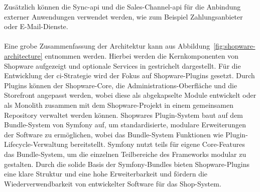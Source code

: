 Zusätzlich können die Sync-\acrshort{api} und die Sales-Channel-\acrshort{api} für die Anbindung externer Anwendungen
verwendet werden, wie zum Beispiel Zahlungsanbieter oder E-Mail-Dienste.
\\\\
Eine grobe Zusammenfassung der Architektur kann aus Abbildung\ \ref{fig:shopware-architecture} entnommen werden.
Hierbei werden die Kernkomponenten von Shopware aufgezeigt und optionale Services in gestrichelt dargestellt.
Für die Entwicklung der \acrshort{ci}-Strategie wird der Fokus auf Shopware-Plugins gesetzt.
Durch Plugins können der Shopware-Core, die Administrations-Oberfläche und die Storefront angepasst werden, wobei diese
als abgekapselte Module entwickelt oder als Monolith zusammen mit dem Shopware-Projekt in einem gemeinsamen Repository
verwaltet werden können.
Shopwares Plugin-System baut auf dem Bundle-System von Symfony auf, um standardisierte, modulare Erweiterungen der
Software zu ermöglichen, wobei das Bundle-System Funktionen wie Plugin-Lifecycle-Verwaltung bereitstellt.
Symfony nutzt teils für eigene Core-Features das Bundle-System, um die einzelnen Teilbereiche des Frameworks modular zu
gestalten.
Durch die solide Basis der Symfony-Bundles bieten Shopware-Plugins eine klare Struktur und eine hohe Erweiterbarkeit
und fördern die Wiederverwendbarkeit von entwickelter Software für das Shop-System.

\clearpage
